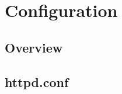 \part{Configuration}


\chapter{Overview}





\chapter{httpd.conf}



\begin{lstlisting}[language=bash]

\end{lstlisting}




\begin{lstlisting}[language=bash]

\end{lstlisting}




\begin{lstlisting}[language=bash]

\end{lstlisting}




\begin{lstlisting}[language=bash]

\end{lstlisting}





\begin{lstlisting}[language=bash]

\end{lstlisting}




\begin{lstlisting}[language=bash]

\end{lstlisting}




\begin{lstlisting}[language=bash]

\end{lstlisting}




